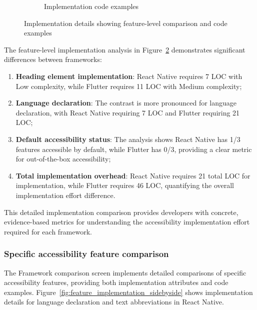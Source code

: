 \begin{figure}[ht]
\begin{subfigure}[b]{0.48\textwidth}
        \caption{Implementation code examples}
        \label{fig:implementation-code-examples}
    \end{subfigure}
    \caption{Implementation details showing feature-level comparison and code examples}
    \label{fig:implementation_details}
\end{figure}

The feature-level implementation analysis in Figure~\ref{fig:implementation_details} demonstrates significant differences between frameworks:

\begin{enumerate}
    \item \textbf{Heading element implementation}: React Native requires 7 LOC with Low complexity, while Flutter requires 11 LOC with Medium complexity;
    
    \item \textbf{Language declaration}: The contrast is more pronounced for language declaration, with React Native requiring 7 LOC and Flutter requiring 21 LOC;
    
    \item \textbf{Default accessibility status}: The analysis shows React Native has 1/3 features accessible by default, while Flutter has 0/3, providing a clear metric for out-of-the-box accessibility;
    
    \item \textbf{Total implementation overhead}: React Native requires 21 total LOC for implementation, while Flutter requires 46 LOC, quantifying the overall implementation effort difference.
\end{enumerate}

This detailed implementation comparison provides developers with concrete, evidence-based metrics for understanding the accessibility implementation effort required for each framework.

\subsubsection{Specific accessibility feature comparison}

The Framework comparison screen implements detailed comparisons of specific accessibility features, providing both implementation attributes and code examples. Figure~\ref{fig:feature_implementation_sidebyside} shows implementation details for language declaration and text abbreviations in React Native.

